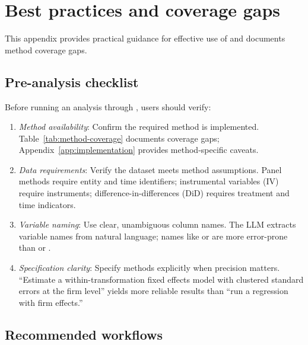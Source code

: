 
\section{Best practices and coverage gaps} \label{app:best-practices}
\setcounter{table}{0}
\setcounter{figure}{0}

This appendix provides practical guidance for effective use of
 and documents method coverage gaps.

\subsection{Pre-analysis checklist}

Before running an analysis through , users should verify:
\begin{enumerate}
  \item \emph{Method availability}: Confirm the required method is implemented.
    Table~\ref{tab:method-coverage} documents coverage gaps;
    Appendix~\ref{app:implementation} provides method-specific caveats.
  \item \emph{Data requirements}: Verify the dataset meets method assumptions.
    Panel methods require entity and time identifiers; instrumental
    variables (IV) require instruments; difference-in-differences (DiD)
    requires treatment and time indicators.
  \item \emph{Variable naming}: Use clear, unambiguous column names. The LLM
    extracts variable names from natural language; names like  or
     are more error-prone than  or .
  \item \emph{Specification clarity}: Specify methods explicitly when
    precision matters. ``Estimate a within-transformation fixed effects model
    with clustered standard errors at the firm level'' yields more reliable
    results than ``run a regression with firm effects.''
\end{enumerate}

\subsection{Recommended workflows}

